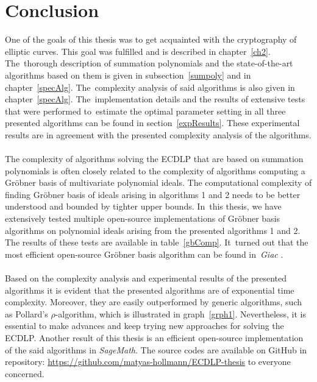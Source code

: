 \documentclass[thesis=M,english]{FITthesis}[2012/10/20]
\theoremstyle{remark}
\theoremstyle{definition}
\begin{document}
\chapter{Conclusion}
One of the goals of this thesis was to get acquainted with the cryptography of elliptic curves. This goal was fulfilled and is described in chapter~\ref{ch2}. The~thorough description of summation polynomials and the state-of-the-art algorithms based on them is given in subsection~\ref{sumpoly} and in chapter~\ref{specAlg}. The~complexity analysis of said algorithms is also given in chapter~\ref{specAlg}. The~implementation details and the results of extensive tests that were performed to~estimate the optimal parameter setting in all three presented algorithms can be found in section~\ref{expResults}. These experimental results are in agreement with the presented complexity analysis of the algorithms. 
\\ \\
\noindent The complexity of algorithms solving the ECDLP that are based on summation polynomials is often closely related to the complexity of algorithms computing a Gröbner basis of multivariate polynomial ideals. The computational complexity of finding Gröbner basis of ideals arising in algorithms 1 and 2 needs to be better understood and bounded by tighter upper bounds. In~this thesis, we have extensively tested multiple open-source implementations of Gröbner basis algorithms on polynomial ideals arising from the presented algorithms 1 and 2. The results of these tests are available in table~\ref{gbComp}. It~turned out that the most efficient open-source Gröbner basis algorithm can be found in~\textit{Giac} \cite{giac}. 
\\ \\
\noindent Based on the complexity analysis and experimental results of the presented algorithms it is evident that the presented algorithms are of exponential time complexity. Moreover, they are easily outperformed by generic algorithms, such as Pollard's $\rho$-algorithm, which is illustrated in graph~\ref{grph1}. Nevertheless, it is essential to make advances and keep trying new approaches for solving the ECDLP. Another result of this thesis is an efficient  open-source implementation of the said algorithms in \textit{SageMath}. The source codes are available on GitHub in repository: \url{https://github.com/matyas-hollmann/ECDLP-thesis} to everyone concerned.

%
%

\end{document}
